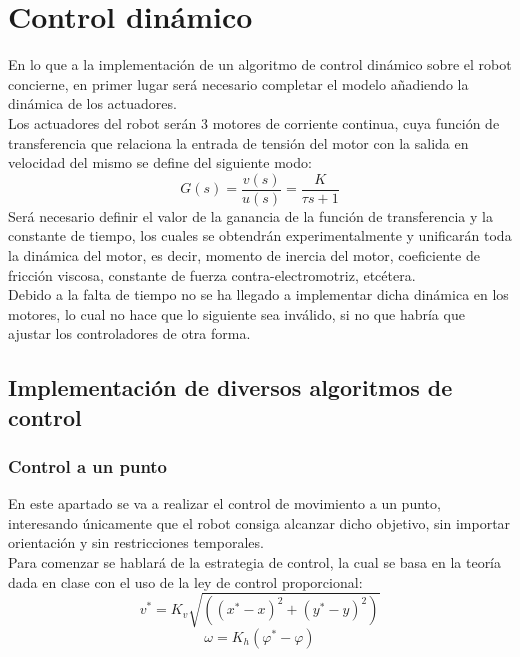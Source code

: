 \documentclass[a4paper,twoside]{article}
\begin{document}
\newpage
\section{Control dinámico}
En lo que a la implementación de un algoritmo de control dinámico sobre el robot concierne, en primer lugar será necesario completar el modelo añadiendo la dinámica de los actuadores.\\
Los actuadores del robot serán 3 motores de corriente continua, cuya función de transferencia que relaciona la entrada de tensión del motor con la salida en velocidad del mismo se define del siguiente modo:
\begin{equation}
	G(s)=\frac{v(s)}{u(s)}=\frac{K}{\tau s+1}
\end{equation}
Será necesario definir el valor de la ganancia de la función de transferencia y la constante de tiempo, los cuales se obtendrán experimentalmente y unificarán toda la dinámica del motor, es decir, momento de inercia del motor, coeficiente de fricción viscosa, constante de fuerza contra-electromotriz, etcétera.\\
Debido a la falta de tiempo no se ha llegado a implementar dicha dinámica en los motores, lo cual no hace que lo siguiente sea inválido, si no que habría que ajustar los controladores de otra forma.
\subsection{Implementación de diversos algoritmos de control}
	\subsubsection{Control a un punto}
	En este apartado se va a realizar el control de movimiento a un punto, interesando únicamente que el robot consiga alcanzar dicho objetivo, sin importar orientación y sin restricciones temporales.\\
	
	Para comenzar se hablará de la estrategia de control, la cual se basa en la teoría dada en clase con el uso de la ley de control proporcional:\\
	
	\begin{equation}
	v^*=K_v\sqrt{((x^*-x)^2+(y^*-y)^2)}	
	\end{equation}
	\begin{equation}
	\omega=K_h(\varphi^*-\varphi)
	\end{equation}
	
\end{document}
